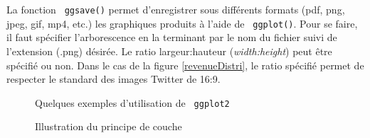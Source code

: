 \documentclass[10.5pt,a4paper]{article}
\newcommand{\rcode}[1]{\texttt{\color{rstudio} #1}}
\begin{document}
  La fonction \rcode{ggsave()} permet d'enregistrer sous différents formats (pdf, png, jpeg, gif, mp4, etc.) les graphiques produits à l'aide de \rcode{ggplot()}. Pour se faire, il faut spécifier l'arborescence en la terminant par le nom du fichier suivi de l'extension (.png) désirée. Le ratio largeur:hauteur (\textit{width:height}) peut être spécifié ou non. Dans le cas de la figure \ref{revenueDistri}, le ratio spécifié permet de respecter le standard des images Twitter de 16:9. 
  
  \begin{figure}[H]
    \centering
    \caption{Quelques exemples d'utilisation de \rcode{ggplot2}}
    \label{visGeom}
    \end{figure}
  
  \begin{figure}[H]
    \centering
    \caption{Illustration du principe de couche}
    \label{visLayers}
    \end{figure}
    
\end{document}
